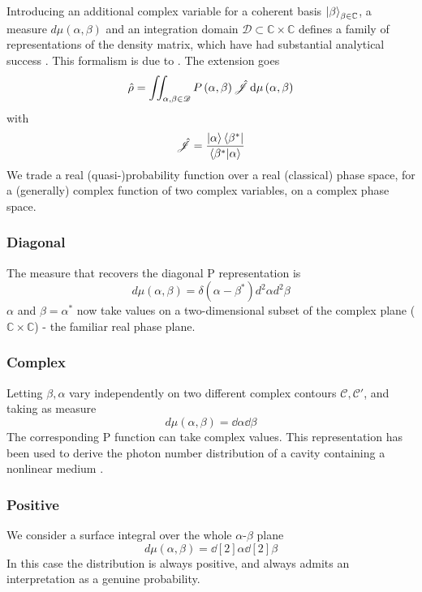 Introducing an additional complex variable for a coherent basis {$\ket{\beta}_{\beta\in\mathbb{C}}$}, a measure $d\mu(\alpha, \beta)$ and an integration domain $\mathscr{D}\subset\mathbb{C}\times\mathbb{C}$ defines a family of representations of the density matrix, which have had substantial analytical success
 \cite{Drummond1979}.
This formalism is due to \cite{Drummond1980}.
The extension goes 
\begin{equation}
  \hat{\rho} = \iint_{\alpha, \beta \in \mathscr{D}}P \left( \alpha, \beta \right) \hat{\mathscr{J}} 
  \dd{\mu \left( \alpha, \beta \right)}
          \label{gen_p_rep}
\end{equation}
with
\begin{equation}
  \hat{\mathscr{J}} = \frac{\ket{\alpha}\bra{\beta^*}}{\braket{\beta^*}{\alpha}} 
\end{equation}
We trade a real (quasi-)probability function over a real (classical) phase space, for a (generally) complex function of two complex variables, on a complex phase space.
\subsubsection{Diagonal} 
The measure that recovers the diagonal P representation is
\begin{equation}
  d\mu(\alpha, \beta) = \delta(\alpha-\beta^*)d^2 \alpha d^2 \beta
\end{equation}
$\alpha$ and $\beta = \alpha^*$ now take values on a two-dimensional subset of the complex plane ($\mathbb{C}\times\mathbb{C}$) - the familiar real phase plane.
\subsubsection{Complex}
Letting $\beta, \alpha$ vary independently on two different complex contours $\mathscr{C}, \mathscr{C}'$, and taking as measure
\begin{equation}
  d\mu\left(\alpha, \beta\right) = \dd{\alpha} \dd{\beta}
\end{equation}
The corresponding P function can take complex values.
This representation has been used to derive the photon number distribution of a cavity containing a nonlinear medium \cite{Drummond1979}.
\subsubsection{Positive}
We consider a surface integral over the whole $\alpha$-$\beta$ plane
\begin{equation}
  d \mu(\alpha, \beta) = \dd[2]{\alpha} \dd[2]{\beta}
\end{equation}
In this case the distribution is always positive, and always admits an interpretation as a genuine probability. 

